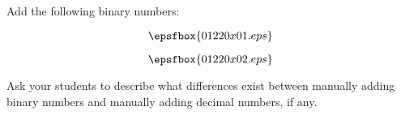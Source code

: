 

Add the following binary numbers:

\vskip 10pt

$$\epsfbox{01220x01.eps}$$

\vskip 10pt







$$\epsfbox{01220x02.eps}$$







Ask your students to describe what differences exist between manually adding binary numbers and manually adding decimal numbers, if any.




